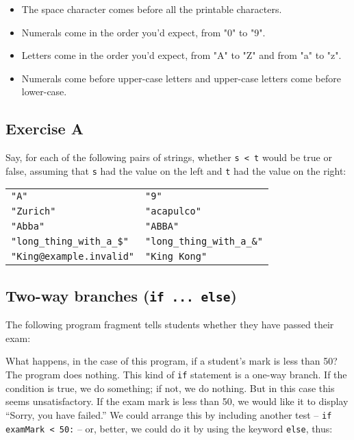 \begin{itemize}
\item
The space character comes before all the printable characters.
\item
Numerals come in the order you'd expect, from "0" to "9".
\item
Letters come in the order you'd expect, from "A" to "Z" and from "a" to "z".
\item
Numerals come before upper-case letters and upper-case letters come before lower-case.
\end{itemize}

\pagebreak

\subsection*{Exercise A}

Say, for each of the following pairs of strings, whether \verb!s < t! would be
true or false, assuming that  \verb!s! had the value on the left and \verb!t!
had the value on the right:
\medskip

\begin{tabular}{ll}
\verb!"A"! & \verb!"9"!\\
\verb!"Zurich"! & \verb!"acapulco"!\\
\verb!"Abba"! & \verb!"ABBA"!\\
\verb!"long_thing_with_a_$"! & \verb!"long_thing_with_a_&"!\\
\verb!"King@example.invalid"! & \verb!"King Kong"!\\
\end{tabular}
\medskip

\subsection{Two-way branches (\texttt{if ... else})}
\label{sec:two-way-branches}

The following program fragment tells students whether they have passed
their exam: 


What happens, in the case of this program, if a student's mark is
less than 50?  The program does nothing.  This kind of \verb!if! statement is a
one-way branch.  If the condition is true, we do something; if not, we do
nothing.  But in this case
this seems unsatisfactory.  If the exam mark is less than 50, we would like
it to display ``Sorry, you have failed.''  We could arrange this by
including another test -- \verb!if examMark < 50:!  -- or, better, we could
do it by using the keyword \verb!else!, thus:

